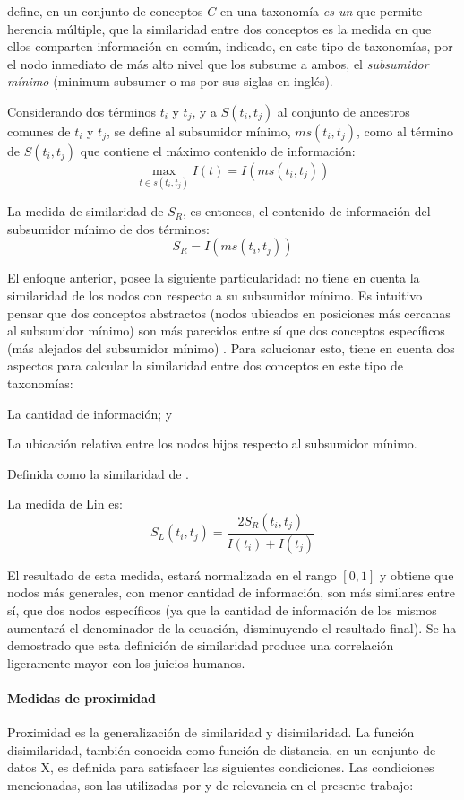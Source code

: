 \bigskip \cite{resnik1995using} define, en un conjunto de conceptos \(C\) en una taxonomía \textit{es-un} que permite herencia múltiple, que la similaridad entre dos conceptos es la medida en que ellos comparten información en común, indicado, en este tipo de taxonomías, por el nodo inmediato de más alto nivel que los subsume a ambos, el \textit{subsumidor mínimo} (minimum subsumer o ms por sus siglas en inglés).

\bigskip Considerando dos términos \(t_i\) y \(t_j\), y a \(S(t_i, t_j)\) al conjunto de ancestros comunes de \(t_i\) y \(t_j\), se define al subsumidor mínimo, \(ms(t_i, t_j)\), como al término de \(S(t_i, t_j)\) que contiene el máximo contenido de información:
\[\max_{t \in s(t_i,t_j)} I(t) = I(ms(t_i,t_j))\]

La medida de similaridad de \cite{resnik1995using} \(S_R\), es entonces, el contenido de información del subsumidor mínimo de dos términos:
\[S_R = I(ms(t_i,t_j))\]

El enfoque anterior, posee la siguiente particularidad: no tiene en cuenta la similaridad de los nodos con respecto a su subsumidor mínimo. Es intuitivo pensar que dos conceptos abstractos (nodos ubicados en posiciones más cercanas al subsumidor mínimo) son más parecidos entre sí que dos conceptos específicos (más alejados del subsumidor mínimo) \citep{lin1998information}. Para solucionar esto, \cite{lin1998information} tiene en cuenta dos aspectos para calcular la similaridad entre dos conceptos en este tipo de taxonomías: \begin{enumerate*} [label=(\roman*)] \item La cantidad de información; y \item La ubicación relativa entre los nodos hijos respecto al subsumidor mínimo.\end{enumerate*} Definida como la similaridad de \cite{resnik1995using}.

\bigskip La medida de Lin es:
\[S_L(t_i, t_j)=\frac{2S_R(t_i,t_j)}{I(t_i)+I(t_j)}\]

El resultado de esta medida, estará normalizada en el rango \([0, 1]\) y obtiene que nodos más generales, con menor cantidad de información, son más similares entre sí, que dos nodos específicos (ya que la cantidad de información de los mismos aumentará el denominador de la ecuación, disminuyendo el resultado final). Se ha demostrado que esta definición de similaridad produce una correlación ligeramente mayor con los juicios humanos.

\paragraph{Medidas de proximidad}
Proximidad es la generalización de similaridad y disimilaridad. La función disimilaridad, también conocida como función de distancia, en un conjunto de datos X, es definida para satisfacer las siguientes condiciones. Las condiciones mencionadas, son las utilizadas por \cite{xu2008clustering} y de relevancia en el presente trabajo:

